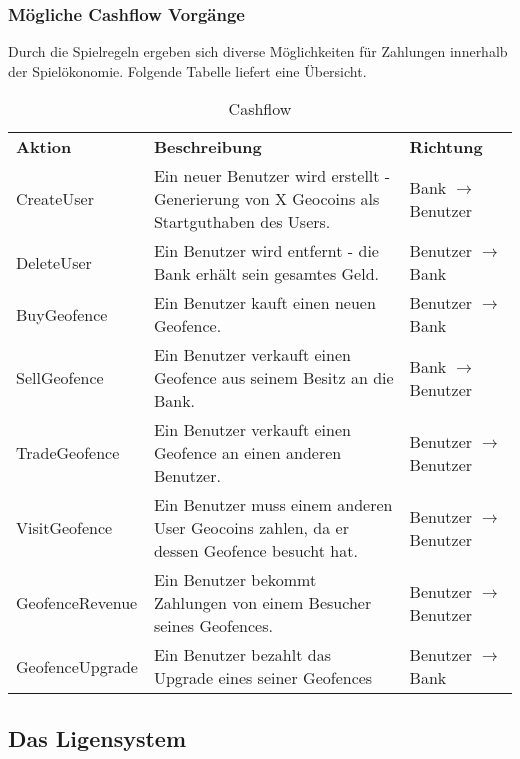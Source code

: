 \documentclass{scrreprt}
\begin{document}
\subsubsection{Mögliche Cashflow Vorgänge}
Durch die Spielregeln ergeben sich diverse Möglichkeiten für Zahlungen innerhalb der Spielökonomie. Folgende Tabelle liefert eine Übersicht.
\begin{table}[h]
     \centering
     \begin{tabular}{l|p{8cm}|l}
		\textbf{Aktion}	&	\textbf{Beschreibung}	&	\textbf{Richtung} \\
       CreateUser          & Ein neuer Benutzer wird erstellt - Generierung von X Geocoins als Startguthaben des Users.  &   Bank $\rightarrow$ Benutzer       \\
       \hline
           DeleteUser        & Ein Benutzer wird entfernt - die Bank erhält sein gesamtes Geld.   &  Benutzer $\rightarrow$ Bank       \\
       \hline
       BuyGeofence       & Ein Benutzer kauft einen neuen Geofence.   &  Benutzer $\rightarrow$ Bank        \\
       \hline
       SellGeofence        & Ein Benutzer verkauft einen Geofence aus seinem Besitz an die Bank.   & Bank $\rightarrow$ Benutzer        \\
       \hline
       TradeGeofence        & Ein Benutzer verkauft einen Geofence an einen anderen Benutzer.   &     Benutzer $\rightarrow$ Benutzer    \\
       \hline
        VisitGeofence        & Ein Benutzer muss einem anderen User Geocoins zahlen, da er dessen Geofence besucht hat.   &   Benutzer $\rightarrow$ Benutzer      \\
       \hline
         GeofenceRevenue        & Ein Benutzer bekommt Zahlungen von einem Besucher seines Geofences.   &    Benutzer $\rightarrow$ Benutzer     \\
       \hline
         GeofenceUpgrade        & Ein Benutzer bezahlt das Upgrade eines seiner Geofences   &  Benutzer $\rightarrow$ Bank       \\
       
     \end{tabular}

     \caption{Cashflow}
     \label{tbl:beispieltabelle}

   \end{table}
\subsection{Das Ligensystem}
\end{document}
